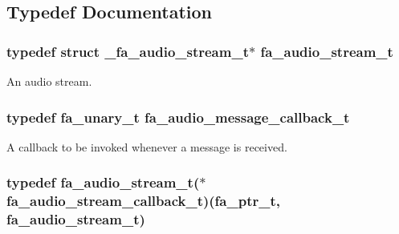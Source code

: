 \subsection{Typedef Documentation}
\hypertarget{group___fa_audio_stream_ga78fbee3026130ce00d8e00a4e73a84c3}{
\subsubsection[{fa\-\_\-audio\-\_\-stream\-\_\-t}]{\setlength{\rightskip}{0pt plus 5cm}typedef struct \-\_\-fa\-\_\-audio\-\_\-stream\-\_\-t$\ast$ {\bf fa\-\_\-audio\-\_\-stream\-\_\-t}}}\label{group___fa_audio_stream_ga78fbee3026130ce00d8e00a4e73a84c3}


An audio stream. 

\hypertarget{group___fa_audio_stream_gaee8c48d438acabf22f2dfa3b85a4196c}{
\subsubsection[{fa\-\_\-audio\-\_\-message\-\_\-callback\-\_\-t}]{\setlength{\rightskip}{0pt plus 5cm}typedef {\bf fa\-\_\-unary\-\_\-t} {\bf fa\-\_\-audio\-\_\-message\-\_\-callback\-\_\-t}}}\label{group___fa_audio_stream_gaee8c48d438acabf22f2dfa3b85a4196c}


A callback to be invoked whenever a message is received. 

\hypertarget{group___fa_audio_stream_gab6aa7a7bed246893a5cb6d20d2e53199}{
\subsubsection[{fa\-\_\-audio\-\_\-stream\-\_\-callback\-\_\-t}]{\setlength{\rightskip}{0pt plus 5cm}typedef {\bf fa\-\_\-audio\-\_\-stream\-\_\-t}($\ast$  fa\-\_\-audio\-\_\-stream\-\_\-callback\-\_\-t)({\bf fa\-\_\-ptr\-\_\-t}, {\bf fa\-\_\-audio\-\_\-stream\-\_\-t})}}\label{group___fa_audio_stream_gab6aa7a7bed246893a5cb6d20d2e53199}


